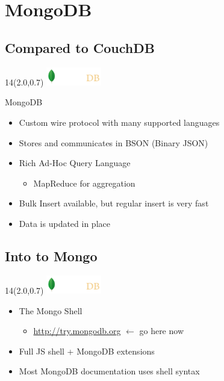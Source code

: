 \documentclass{beamer}
\newcommand{\MongoLogo}{
\begin{textblock}{14}(2.0,0.7)
  \includegraphics[height=0.8cm]{logo-mongodb-ondark.png}
\end{textblock}
}
\begin{document}
\section{MongoDB}
\subsection{Compared to CouchDB}
\begin{frame}[fragile]
  \MongoLogo

  \begin{block} {MongoDB}
    \begin{itemize}
      \item Custom wire protocol with many supported languages
      \item Stores and communicates in BSON (Binary JSON)
      \item Rich Ad-Hoc Query Language 
        \begin{itemize}
          \item MapReduce for aggregation
        \end{itemize}
      \item Bulk Insert available, but regular insert is very fast
      \item Data is updated in place
    \end{itemize}
  \end{block}
\end{frame}


\subsection{Into to Mongo}

\begin{frame}[fragile]
  \MongoLogo
  \begin{itemize}
    \item The Mongo Shell
      \begin{itemize}
        \item \url{http://try.mongodb.org} ${\leftarrow}$ go here now
      \end{itemize}
    \item Full JS shell + MongoDB extensions
    \item Most MongoDB documentation uses shell syntax
  \end{itemize}
\end{frame}
\end{document}
